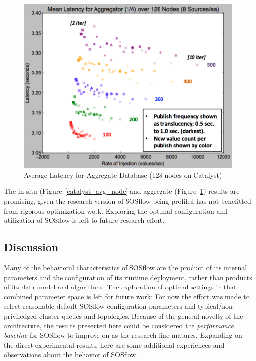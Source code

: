 \begin{figure}[h]
\centering
\includegraphics[width=\columnwidth]{images/avg_128.png}
\caption{Average Latency for Aggregate Database (128 nodes on Catalyst)}
\label{catalyst_avg_128}
\end{figure}

%
The in situ (Figure~\ref{catalyst_avg_node} and aggregate
(Figure~\ref{catalyst_avg_128}) results are promising, given the
research version of SOSflow being profiled has not benefitted from
rigorous optimization work.
%
Exploring the optimal configuration and utilization of SOSflow is left
to future research effort.
%
\subsection{Discussion}
%
Many of the behavioral characteristics of SOSflow are the product of
its internal parameters and the configuration of its runtime
deployment, rather than products of its data model and algorithms.
%
The exploration of optimal settings in that combined parameter space
is left for future work: For now the effort was made to select
reasonable default SOSflow configuration parameters and
typical/non-priviledged cluster queues and topologies.
%
Because of the general novelty of the architecture, the results
presented here could be considered the \textit{performance baseline}
for SOSflow to improve on as the research line matures.
%
Expanding on the direct experimental results, here are some additional
experiences and observations about the behavior of SOSflow.
%
